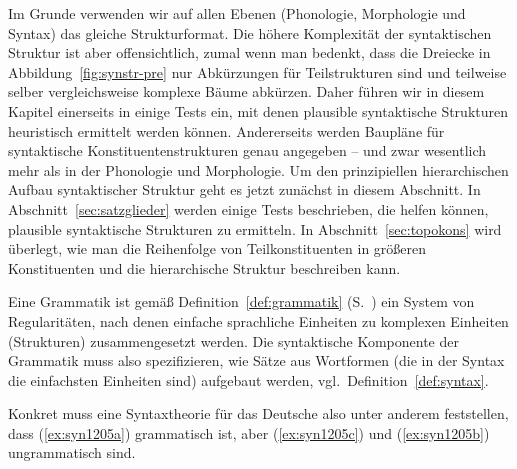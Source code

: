 Im Grunde verwenden wir auf allen Ebenen (Phonologie, Morphologie und Syntax) das gleiche Strukturformat.
Die höhere Komplexität der syntaktischen Struktur ist aber offensichtlich, zumal wenn man bedenkt, dass die Dreiecke in Abbildung~\ref{fig:synstr-pre} nur Abkürzungen für Teilstrukturen sind und teilweise selber vergleichsweise komplexe Bäume abkürzen.
Daher führen wir in diesem Kapitel einerseits in einige Tests ein, mit denen plausible syntaktische Strukturen heuristisch ermittelt werden können.
Andererseits werden Baupläne für syntaktische Konstituentenstrukturen genau angegeben -- und zwar wesentlich mehr als in der Phonologie und Morphologie.
Um den prinzipiellen hierarchischen Aufbau syntaktischer Struktur geht es jetzt zunächst in diesem Abschnitt.
In Abschnitt~\ref{sec:satzglieder} werden einige Tests beschrieben, die helfen können, plausible syntaktische Strukturen zu ermitteln.
In Abschnitt~\ref{sec:topokons} wird überlegt, wie man die Reihenfolge von Teilkonstituenten in größeren Konstituenten und die hierarchische Struktur beschreiben kann.


Eine Grammatik ist gemäß Definition~\ref{def:grammatik} (S.~\pageref{def:grammatik}) ein System von Regularitäten, nach denen einfache sprachliche Einheiten zu komplexen Einheiten (Strukturen) zusammengesetzt werden.
Die syntaktische Komponente der Grammatik muss also spezifizieren, wie Sätze aus Wortformen (die in der Syntax die einfachsten Einheiten sind) aufgebaut werden, vgl.\ Definition~\ref{def:syntax}.


Konkret muss eine Syntaxtheorie für das Deutsche also unter anderem feststellen, dass (\ref{ex:syn1205a}) grammatisch ist, aber (\ref{ex:syn1205c}) und (\ref{ex:syn1205b}) ungrammatisch sind.

\begin{exe}
  \ex\label{ex:syn1205}
  \begin{xlist}
  \end{xlist}
\end{exe}

